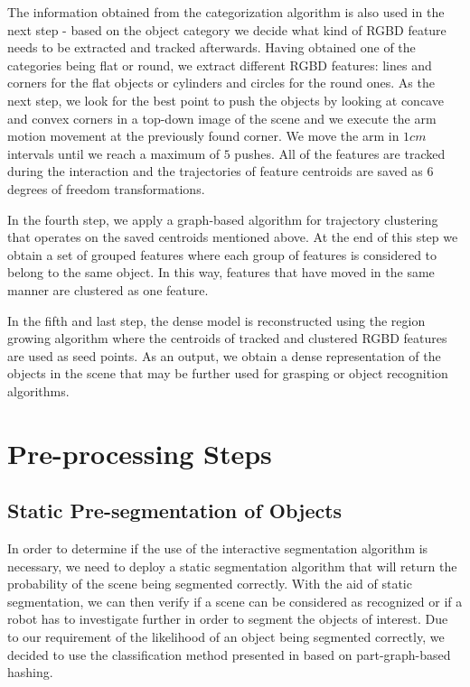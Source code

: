  The information obtained from the categorization algorithm is also used in the next step - based on the object category we decide what kind of RGBD feature needs to be extracted and tracked afterwards. Having obtained one of the categories being flat or round, we extract different RGBD features: lines and corners for the flat objects or cylinders and circles for the round ones. As the next step, we look for the best point to push the objects by looking at concave and convex corners in a top-down image of the scene and we execute the arm motion movement at the previously found corner. We move the arm in $1cm$ intervals until we reach a maximum of $5$ 
  pushes. All of the features are tracked during the interaction 
 and the trajectories of feature centroids  are  saved as 6 degrees of freedom transformations. 
 
  
In the fourth step, we apply a graph-based algorithm for trajectory clustering that operates on the saved centroids mentioned above. At the end of this step we obtain a set of grouped features where each group of features is considered to belong to the same object. In this way, features that have moved in the same manner are clustered as one feature. 

 In the fifth and last step, the dense model is reconstructed using the region growing algorithm 
where the centroids of tracked and clustered RGBD features are
used as seed points. As an output, we obtain a dense representation of the objects in the scene that may be further used for grasping or object recognition algorithms.

\section{Pre-processing Steps}


\subsection{Static Pre-segmentation of Objects}
\label{sec:static-seg}

In order to determine if the use of the interactive segmentation algorithm is necessary, we need to deploy a static segmentation algorithm that will return the probability of the scene being segmented correctly. With the aid of static segmentation, we can then verify if a scene can be considered as recognized or if a robot has to investigate further in order to segment the objects of interest. Due to our requirement of the likelihood of an object being segmented correctly, we decided to use the classification method presented in \cite{marton12SC} based on part-graph-based hashing.

